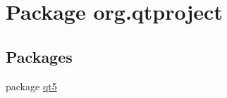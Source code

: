 \hypertarget{namespaceorg_1_1qtproject}{\section{Package org.\+qtproject}
\label{namespaceorg_1_1qtproject}
}
\subsection*{Packages}
\begin{DoxyCompactItemize}
\item 
package \hyperlink{namespaceorg_1_1qtproject_1_1qt5}{qt5}
\end{DoxyCompactItemize}
